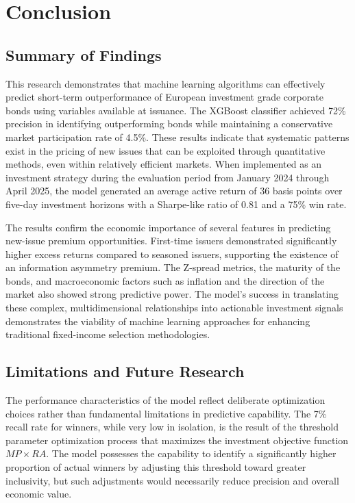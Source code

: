 \chapter{Conclusion}
\label{ch:conclusion}

\section{Summary of Findings}

This research demonstrates that machine learning algorithms can effectively predict short-term outperformance of European investment grade corporate bonds using variables available at issuance. The XGBoost classifier achieved 72\% precision in identifying outperforming bonds while maintaining a conservative market participation rate of 4.5\%. These results indicate that systematic patterns exist in the pricing of new issues that can be exploited through quantitative methods, even within relatively efficient markets. When implemented as an investment strategy during the evaluation period from January 2024 through April 2025, the model generated an average active return of 36 basis points over five-day investment horizons with a Sharpe-like ratio of 0.81 and a 75\% win rate.

The results confirm the economic importance of several features in predicting new-issue premium opportunities. First-time issuers demonstrated significantly higher excess returns compared to seasoned issuers, supporting the existence of an information asymmetry premium. The Z-spread metrics, the maturity of the bonds, and macroeconomic factors such as inflation and the direction of the market also showed strong predictive power. The model's success in translating these complex, multidimensional relationships into actionable investment signals demonstrates the viability of machine learning approaches for enhancing traditional fixed-income selection methodologies.

\section{Limitations and Future Research}

The performance characteristics of the model reflect deliberate optimization choices rather than fundamental limitations in predictive capability. The 7\% recall rate for winners, while very low in isolation, is the result of the threshold parameter optimization process that maximizes the investment objective function $MP \times RA$. The model possesses the capability to identify a significantly higher proportion of actual winners by adjusting this threshold toward greater inclusivity, but such adjustments would necessarily reduce precision and overall economic value.

